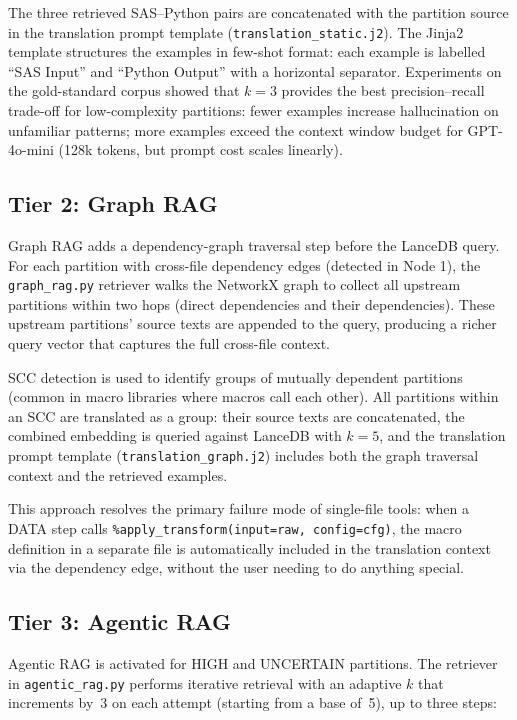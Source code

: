 The three retrieved SAS--Python pairs are concatenated with the partition source
in the translation prompt template (\texttt{translation\_static.j2}). The Jinja2
template structures the examples in few-shot format: each example is labelled
``SAS Input'' and ``Python Output'' with a horizontal separator. Experiments on
the gold-standard corpus showed that $k=3$ provides the best
precision--recall trade-off for low-complexity partitions: fewer examples increase
hallucination on unfamiliar patterns; more examples exceed the context window
budget for GPT-4o-mini (128k tokens, but prompt cost scales linearly).

\subsection{Tier 2: Graph RAG}
\label{subsec:graph-rag-impl}

Graph RAG adds a dependency-graph traversal step before the LanceDB query.
For each partition with cross-file dependency edges (detected in Node 1), the
\texttt{graph\_rag.py} retriever walks the NetworkX graph to collect all
upstream partitions within two hops (direct dependencies and their dependencies).
These upstream partitions' source texts are appended to the query, producing a
richer query vector that captures the full cross-file context.

SCC detection is used to identify groups of mutually dependent partitions (common
in macro libraries where macros call each other). All partitions within an SCC
are translated as a group: their source texts are concatenated, the combined
embedding is queried against LanceDB with $k=5$, and the translation prompt
template (\texttt{translation\_graph.j2}) includes both the graph traversal
context and the retrieved examples.

This approach resolves the primary failure mode of single-file tools: when a
DATA step calls \texttt{\%apply\_transform(input=raw, config=cfg)}, the macro
definition in a separate file is automatically included in the translation
context via the dependency edge, without the user needing to do anything special.

\subsection{Tier 3: Agentic RAG}
\label{subsec:agentic-rag-impl}

Agentic RAG is activated for HIGH and UNCERTAIN partitions. The retriever in
\texttt{agentic\_rag.py} performs iterative retrieval with an adaptive $k$ that
increments by~3 on each attempt (starting from a base of~5), up to three steps:


